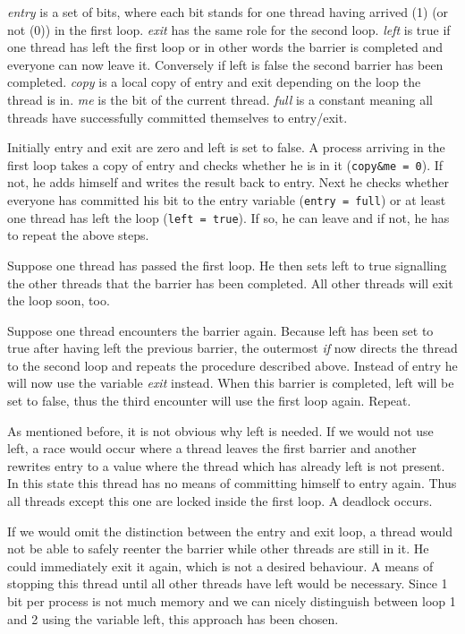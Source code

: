 \documentclass[a4paper, 10pt]{article}
\begin{document}
\emph{entry} is a set of bits, where each bit stands for one thread having arrived (1) (or not (0)) in the first loop. \emph{exit} has the same role for the second loop. \emph{left} is true if one thread has left the first loop or in other words the barrier is completed and everyone can now leave it. Conversely if left is false the second barrier has been completed. \emph{copy} is a local copy of entry and exit depending on the loop the thread is in. \emph{me} is the bit of the current thread. \emph{full} is a constant meaning all threads have successfully committed themselves to entry/exit.

Initially entry and exit are zero and left is set to false. A process arriving in the first loop takes a copy of entry and checks whether he is in it (\texttt{copy\&me = 0}). If not, he adds himself and writes the result back to entry. Next he checks whether everyone has committed his bit to the entry variable (\texttt{entry = full}) or at least one thread has left the loop (\texttt{left = true}). If so, he can leave and if not, he has to repeat the above steps.

Suppose one thread has passed the first loop. He then sets left to true signalling the other threads that the barrier has been completed. All other threads will exit the loop soon, too.

Suppose one thread encounters the barrier again. Because left has been set to true after having left the previous barrier, the outermost \emph{if} now directs the thread to the second loop and repeats the procedure described above. Instead of entry he will now use the variable \emph{exit} instead. When this barrier is completed, left will be set to false, thus the third encounter will use the first loop again. Repeat.

As mentioned before, it is not obvious why left is needed. If we would not use left, a race would occur where a thread leaves the first barrier and another rewrites entry to a value where the thread which has already left is not present. In this state this thread has no means of committing himself to entry again. Thus all threads except this one are locked inside the first loop. A deadlock occurs.

If we would omit the distinction between the entry and exit loop, a thread would not be able to safely reenter the barrier while other threads are still in it. He could immediately exit it again, which is not a desired behaviour. A means of stopping this thread until all other threads have left would be necessary. Since 1 bit per process is not much memory and we can nicely distinguish between loop 1 and 2 using the variable left, this approach has been chosen.
\end{document}

